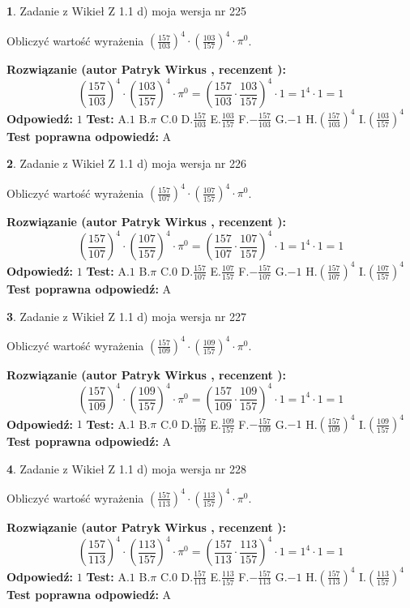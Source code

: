 \documentclass[12pt, a4paper]{article}
\theoremstyle{definition} %
\newtheorem{zad}{}
\newcommand{\zadStart}[1]{\begin{zad}#1\newline}
\newcommand{\zadStop}{\end{zad}}
\newcommand{\rozwStart}[2]{\noindent \textbf{Rozwiązanie (autor #1 , recenzent #2): }\newline}
\newcommand{\rozwStop}{\newline}
\newcommand{\odpStart}{\noindent \textbf{Odpowiedź:}\newline}
\newcommand{\odpStop}{\newline}
\newcommand{\testStart}{\noindent \textbf{Test:}\newline}
\newcommand{\testStop}{\newline}
\newcommand{\kluczStart}{\noindent \textbf{Test poprawna odpowiedź:}\newline}
\newcommand{\kluczStop}{\newline}
\begin{document}
\zadStart{Zadanie z Wikieł Z 1.1 d) moja wersja nr 225}

Obliczyć wartość wyrażenia $(\frac{157}{103})^{4} \cdot (\frac{103}{157})^{4} \cdot \pi^{0}$.
\zadStop
\rozwStart{Patryk Wirkus}{}
$$(\frac{157}{103})^{4} \cdot (\frac{103}{157})^{4} \cdot \pi^{0} = (\frac{157}{103} \cdot \frac{103}{157})^{4} \cdot 1 = 1^{4} \cdot 1 = 1$$
\rozwStop
\odpStart
$1$
\odpStop
\testStart
A.$1$ B.$\pi$ C.$0$ D.$\frac{157}{103}$ E.$\frac{103}{157}$
F.$-\frac{157}{103}$ G.$-1$
H.$(\frac{157}{103})^{4}$
I.$(\frac{103}{157})^{4}$
\testStop
\kluczStart
A
\kluczStop



\zadStart{Zadanie z Wikieł Z 1.1 d) moja wersja nr 226}

Obliczyć wartość wyrażenia $(\frac{157}{107})^{4} \cdot (\frac{107}{157})^{4} \cdot \pi^{0}$.
\zadStop
\rozwStart{Patryk Wirkus}{}
$$(\frac{157}{107})^{4} \cdot (\frac{107}{157})^{4} \cdot \pi^{0} = (\frac{157}{107} \cdot \frac{107}{157})^{4} \cdot 1 = 1^{4} \cdot 1 = 1$$
\rozwStop
\odpStart
$1$
\odpStop
\testStart
A.$1$ B.$\pi$ C.$0$ D.$\frac{157}{107}$ E.$\frac{107}{157}$
F.$-\frac{157}{107}$ G.$-1$
H.$(\frac{157}{107})^{4}$
I.$(\frac{107}{157})^{4}$
\testStop
\kluczStart
A
\kluczStop



\zadStart{Zadanie z Wikieł Z 1.1 d) moja wersja nr 227}

Obliczyć wartość wyrażenia $(\frac{157}{109})^{4} \cdot (\frac{109}{157})^{4} \cdot \pi^{0}$.
\zadStop
\rozwStart{Patryk Wirkus}{}
$$(\frac{157}{109})^{4} \cdot (\frac{109}{157})^{4} \cdot \pi^{0} = (\frac{157}{109} \cdot \frac{109}{157})^{4} \cdot 1 = 1^{4} \cdot 1 = 1$$
\rozwStop
\odpStart
$1$
\odpStop
\testStart
A.$1$ B.$\pi$ C.$0$ D.$\frac{157}{109}$ E.$\frac{109}{157}$
F.$-\frac{157}{109}$ G.$-1$
H.$(\frac{157}{109})^{4}$
I.$(\frac{109}{157})^{4}$
\testStop
\kluczStart
A
\kluczStop



\zadStart{Zadanie z Wikieł Z 1.1 d) moja wersja nr 228}

Obliczyć wartość wyrażenia $(\frac{157}{113})^{4} \cdot (\frac{113}{157})^{4} \cdot \pi^{0}$.
\zadStop
\rozwStart{Patryk Wirkus}{}
$$(\frac{157}{113})^{4} \cdot (\frac{113}{157})^{4} \cdot \pi^{0} = (\frac{157}{113} \cdot \frac{113}{157})^{4} \cdot 1 = 1^{4} \cdot 1 = 1$$
\rozwStop
\odpStart
$1$
\odpStop
\testStart
A.$1$ B.$\pi$ C.$0$ D.$\frac{157}{113}$ E.$\frac{113}{157}$
F.$-\frac{157}{113}$ G.$-1$
H.$(\frac{157}{113})^{4}$
I.$(\frac{113}{157})^{4}$
\testStop
\kluczStart
A
\kluczStop
\end{document}
